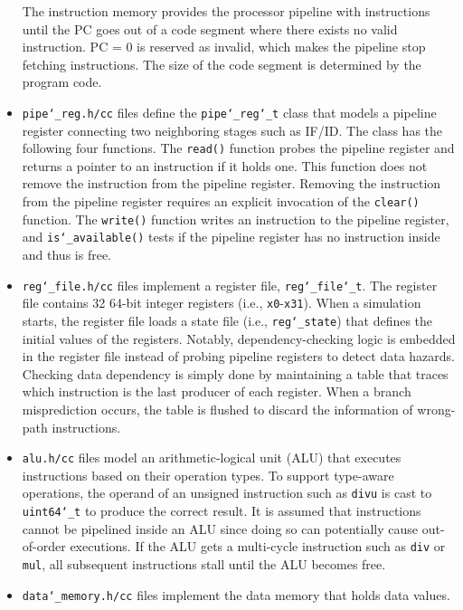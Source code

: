 \documentclass[10pt]{article}
\begin{document}
\begin{itemize}
    The instruction memory provides the processor pipeline with instructions until the PC goes out of a code segment where there exists no valid instruction.
    PC = 0 is reserved as invalid, which makes the pipeline stop fetching instructions.
    The size of the code segment is determined by the program code.
\item
    {\tt\small pipe\char`_reg.h/cc} files define the {\tt\small pipe\char`_reg\char`_t} class that models a pipeline register connecting two neighboring stages such as IF/ID.
    The class has the following four functions.
    The {\tt\small read()} function probes the pipeline register and returns a pointer to an instruction if it holds one.
    This function does not remove the instruction from the pipeline register.
    Removing the instruction from the pipeline register requires an explicit invocation of the {\tt\small clear()} function.
    The {\tt\small write()} function writes an instruction to the pipeline register, and {\tt\small is\char`_available()} tests if the pipeline register has no instruction inside and thus is free.
\item{\tt\small reg\char`_file.h/cc} files implement a register file, {\tt\small reg\char`_file\char`_t}.
    The register file contains 32 64-bit integer registers (i.e., {\tt\small x0}-{\tt\small x31}).
    When a simulation starts, the register file loads a state file (i.e., {\tt\small reg\char`_state}) that defines the initial values of the registers.
    Notably, dependency-checking logic is embedded in the register file instead of probing pipeline registers to detect data hazards.
    Checking data dependency is simply done by maintaining a table that traces which instruction is the last producer of each register.
    When a branch misprediction occurs, the table is flushed to discard the information of wrong-path instructions.
\item
    {\tt\small alu.h/cc} files model an arithmetic-logical unit (ALU) that executes instructions based on their operation types.
    To support type-aware operations, the operand of an unsigned instruction such as {\tt\small divu} is cast to {\tt\small uint64\char`_t} to produce the correct result.
    It is assumed that instructions cannot be pipelined inside an ALU since doing so can potentially cause out-of-order executions.
    If the ALU gets a multi-cycle instruction such as {\tt\small div} or {\tt\small mul}, all subsequent instructions stall until the ALU becomes free.
\item
    {\tt\small data\char`_memory.h/cc} files implement the data memory that holds data values.

\end{itemize}
\end{document}
